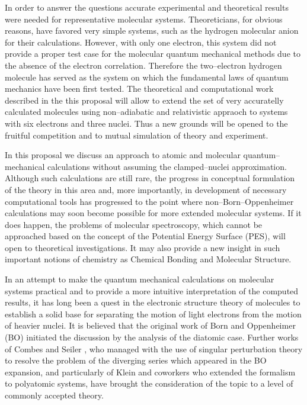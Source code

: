 In order to answer the questions accurate experimental
and theoretical results were needed for representative
molecular systems. Theoreticians, for obvious reasons, have
favored very simple systems, such as the hydrogen molecular
anion for their calculations. However, with only one electron,
this system did not provide a proper test case for the molecular
quantum mechanical methods due to the absence of the
electron correlation. Therefore the two--electron hydrogen
molecule has served as the system on which the fundamental
laws of quantum mechanics have been first tested.
The theoretical and computational work described  in the
this proposal will allow to extend the set of very
accuratelly calculated molecules using non--adiabatic
and relativistic appraoch to systems with six electrons
and three nuclei. Thus a new grounds will be opened to
the fruitful competition and to mutual simulation of
theory and experiment.



In this proposal we discuss an approach to atomic and 
molecular quantum--mechanical calculations without assuming 
the clamped--nuclei approximation. Although such calculations
are still rare, the progress
in conceptual formulation of the theory in this area and, more
importantly, in development of necessary computational tools
has progressed to the point where non--Born--Oppenheimer
calculations may soon become possible for more extended molecular
systems. If it does happen, 
the problems of molecular spectroscopy,
which cannot be approached based 
on the concept of the Potential Energy Surface (PES),
will open to theoretical investigations.
It may also provide a new insight in such important notions of
chemistry as Chemical Bonding and Molecular Structure.

In an attempt to make the quantum mechanical calculations on 
molecular systems practical and to provide a more intuitive
interpretation of the computed results, it has long been a quest
in the electronic structure theory of molecules 
to establish a solid base for separating
the motion of light electrons from the motion of heavier nuclei.
It is believed that the original work of Born and Oppenheimer (BO)
\cite{BO1927} initiated the discussion by the analysis
of the diatomic case. Further works of Combes and Seiler
\cite{CS1980}, who managed with the use of singular perturbation
theory to resolve the problem of the diverging series which appeared
in the BO expansion, and particularly of Klein and coworkers
\cite{KM1992} who extended the formalism to polyatomic systems,
have brought the consideration of the topic to a level of commonly
accepted theory.

